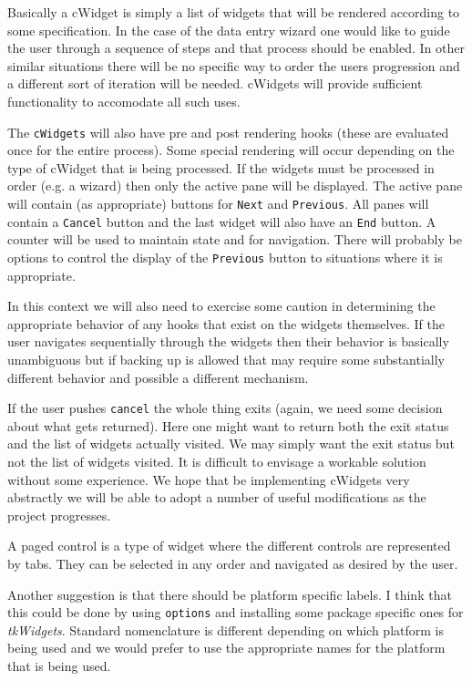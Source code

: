 \documentclass{article}
\begin{document}
Basically a cWidget is simply a list of widgets that will
be rendered according to some specification. 
In the case of the data entry wizard one would like to guide the user
through a sequence of steps and that process should be enabled. In
other similar situations there will be no specific way to order the
users progression and a different sort of iteration will be needed. 
cWidgets will provide sufficient functionality to accomodate all such
uses.

The \verb+cWidgets+ will also have pre and
post rendering hooks (these are evaluated once for the entire
process). 
Some special rendering will occur depending on the type of cWidget
that is being processed. If the widgets must be processed in order
(e.g. a wizard) then only the active pane will be displayed. The
active pane will contain (as appropriate) buttons for \verb+Next+ 
and \verb+Previous+. All panes will contain a \verb+Cancel+ button and
the last widget will also have an \verb+End+ button. A counter
will be used to maintain state and for navigation. 
There will probably be options to control the display of the
\verb+Previous+ button to situations where it is appropriate. 

In this context we will also need to exercise some caution in
determining the appropriate behavior of any hooks that exist on the
widgets themselves. If the user navigates sequentially through the
widgets then their behavior is basically unambiguous but if backing up
is allowed that may require some substantially different behavior and
possible a different mechanism.

If the user pushes \verb+cancel+ the whole thing exits (again, we need
some decision about what gets returned). Here one might want to return
both the exit status and the list of widgets actually visited.
We may simply want the exit status but not the list of
widgets visited.
It is difficult to envisage a workable solution without some
experience. We hope that be implementing cWidgets very abstractly we
will be able to adopt a number of useful modifications as the project
progresses.

A paged control is a type of widget where the different
controls are represented by tabs. They can be selected in any order
and navigated as desired by the user.

Another suggestion is that there should be platform specific labels.
I think that this could be done by using \verb+options+ and installing
some package specific ones for {\em tkWidgets}.
Standard nomenclature is different depending on which platform is
being used and we would prefer to use the appropriate names for the
platform that is being used. 
\end{document}
